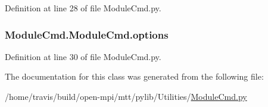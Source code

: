 Definition at line 28 of file Module\-Cmd.\-py.

\hypertarget{class_module_cmd_1_1_module_cmd_a981a0fc879a722b76faa16b4289ab953}{
\subsubsection[{options}]{\setlength{\rightskip}{0pt plus 5cm}Module\-Cmd.\-Module\-Cmd.\-options}}\label{class_module_cmd_1_1_module_cmd_a981a0fc879a722b76faa16b4289ab953}


Definition at line 30 of file Module\-Cmd.\-py.



The documentation for this class was generated from the following file\-:\begin{DoxyCompactItemize}
\item 
/home/travis/build/open-\/mpi/mtt/pylib/\-Utilities/\hyperlink{_module_cmd_8py}{Module\-Cmd.\-py}\end{DoxyCompactItemize}
